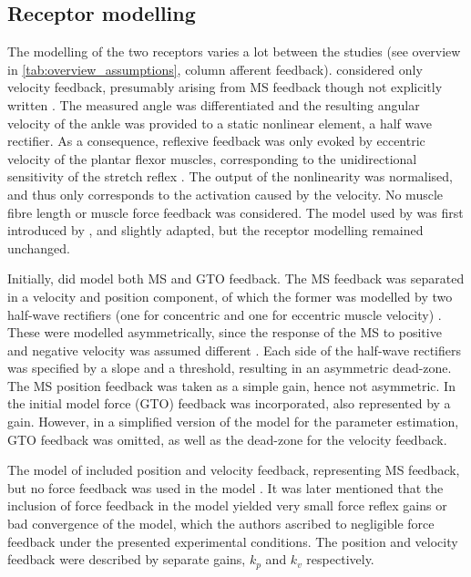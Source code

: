 \subsection{Receptor modelling}
The modelling of the two receptors varies a lot between the studies (see overview in \autoref{tab:overview_assumptions}, column afferent feedback). \citeauthor{mirbagheri_intrinsic_2000} considered only velocity feedback, presumably arising from MS feedback though not explicitly written \cite{mirbagheri_intrinsic_2000}. The measured angle was differentiated and the resulting angular velocity of the ankle was provided to a static nonlinear element, a half wave rectifier. As a consequence, reflexive feedback was only evoked by eccentric velocity of the plantar flexor muscles, corresponding to the unidirectional sensitivity of the stretch reflex \cite{kearney_system_1983}. The output of the nonlinearity was normalised, and thus only corresponds to the activation caused by the velocity. No muscle fibre length or muscle force feedback was considered. The model used by \citeauthor{mirbagheri_intrinsic_2000} was first introduced by \citeauthor{kearney_identification_1997}, and slightly adapted, but the receptor modelling remained unchanged. 

Initially, \citeauthor{zhang_simultaneous_1997} did model both MS and GTO feedback. The MS feedback was separated in a velocity and position component, of which the former was modelled by two half-wave rectifiers (one for concentric and one for eccentric muscle velocity) \cite{zhang_simultaneous_1997}. These were modelled asymmetrically, since the response of the MS to positive and negative velocity was assumed different \cite{houk_neural_1981}. Each side of the half-wave rectifiers was specified by a slope and a threshold, resulting in an asymmetric dead-zone. The MS position feedback was taken as a simple gain, hence not asymmetric. In the initial model force (GTO) feedback was incorporated, also represented by a gain. However, in a simplified version of the model for the parameter estimation, GTO feedback was omitted, as well as the dead-zone for the velocity feedback. %

The model of \citeauthor{van_der_helm_identification_2002} included position and velocity feedback, representing MS feedback, but no force feedback was used in the model \cite{van_der_helm_identification_2002}. It was later mentioned that the inclusion of force feedback in the model yielded very small force reflex gains or bad convergence of the model, which the authors ascribed to negligible force feedback under the presented experimental conditions. The position and velocity feedback were described by separate gains, $k_p$ and $k_v$ respectively. 

